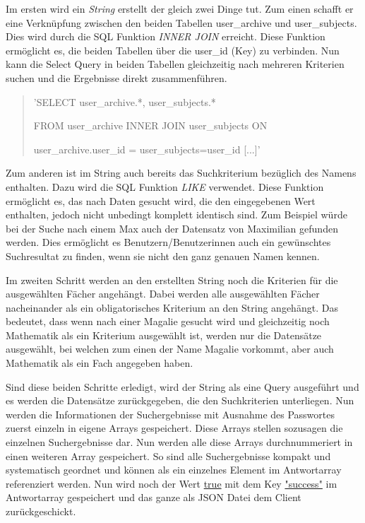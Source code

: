 \documentclass[a4paper,11pt]{report}
\begin{document}
					Im ersten wird ein \emph{String} erstellt der gleich zwei Dinge tut. Zum einen schafft er eine Verknüpfung zwischen den beiden Tabellen user\_archive und user\_subjects. Dies wird durch die SQL Funktion \emph{INNER JOIN} erreicht.
					Diese Funktion ermöglicht es, die beiden Tabellen über die user\_id (Key) zu verbinden. Nun kann die Select Query in beiden Tabellen gleichzeitig nach mehreren Kriterien suchen und die Ergebnisse direkt zusammenführen.
					\begin{quotation}
						{\selectfont\noindent 'SELECT user\_archive.*, user\_subjects.* 
							
						\noindent FROM user\_archive INNER JOIN user\_subjects ON
						
						\noindent user\_archive.user\_id = user\_subjects=user\_id [...]'}
					\end{quotation} 
					Zum anderen ist im String auch bereits das Suchkriterium bezüglich des Namens enthalten. Dazu wird die SQL Funktion \emph{LIKE} verwendet. Diese Funktion ermöglicht es, das nach Daten gesucht wird, die den eingegebenen Wert enthalten, jedoch nicht unbedingt komplett identisch sind. Zum Beispiel würde bei der Suche nach einem \glqq Max\grqq{} auch der Datensatz von \glqq Maximilian\grqq{} gefunden werden. Dies ermöglicht es Benutzern/Benutzerinnen auch ein gewünschtes Suchresultat zu finden, wenn sie nicht den ganz genauen Namen kennen.
					
					Im zweiten Schritt werden an den erstellten String noch die Kriterien für die ausgewählten Fächer angehängt. Dabei werden alle ausgewählten Fächer nacheinander als ein obligatorisches Kriterium an den String angehängt. Das bedeutet, dass wenn nach einer \glqq Magalie\grqq{} gesucht wird und gleichzeitig noch Mathematik als ein Kriterium ausgewählt ist, werden nur die Datensätze ausgewählt, bei welchen zum einen der Name \glqq Magalie\grqq{} vorkommt, aber auch Mathematik als ein Fach angegeben haben.
					
					Sind diese beiden Schritte erledigt, wird der String als eine Query ausgeführt und es werden die Datensätze zurückgegeben, die den Suchkriterien unterliegen. Nun werden die Informationen der Suchergebnisse mit Ausnahme des Passwortes zuerst einzeln in eigene Arrays gespeichert. Diese Arrays stellen sozusagen die einzelnen Suchergebnisse dar. Nun werden alle diese Arrays durchnummeriert in einen weiteren Array gespeichert. So sind alle Suchergebnisse kompakt und systematisch geordnet und können als ein einzelnes Element im Antwortarray referenziert werden. Nun wird noch der Wert \url{true} mit dem Key \url{"success"} im Antwortarray gespeichert und das ganze als JSON Datei dem Client zurückgeschickt.
					
\end{document}
